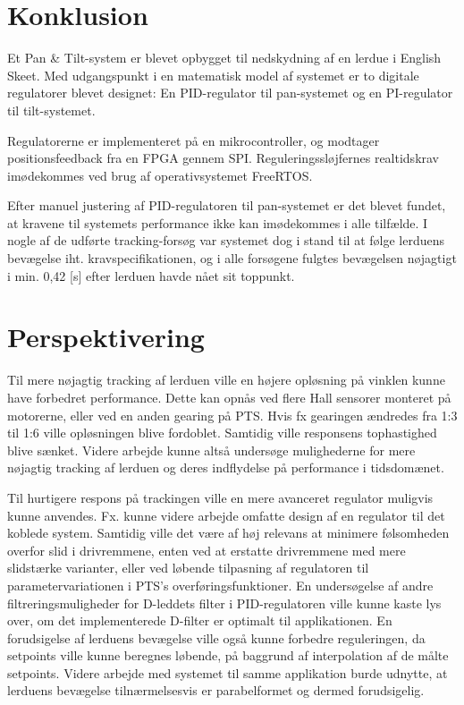 \section{Konklusion}
\label{sec:konklusion}
Et Pan \& Tilt-system er blevet opbygget til nedskydning af en lerdue i English Skeet.
Med udgangspunkt i en matematisk model af systemet er to digitale regulatorer
blevet designet: En PID-regulator til pan-systemet og en PI-regulator til tilt-systemet.

Regulatorerne er implementeret på en mikrocontroller, og modtager positionsfeedback
fra en FPGA gennem SPI.
Reguleringssløjfernes realtidskrav imødekommes ved brug af operativsystemet FreeRTOS.

Efter manuel justering af PID-regulatoren til pan-systemet er det blevet fundet,
at kravene til systemets performance ikke kan imødekommes i alle tilfælde.
I nogle af de udførte tracking-forsøg var systemet dog i stand til at følge lerduens bevægelse
iht. kravspecifikationen,
og i alle forsøgene fulgtes bevægelsen nøjagtigt i min. 0,42 [s] efter lerduen havde nået sit toppunkt.

\section{Perspektivering}
Til mere nøjagtig tracking af lerduen ville en højere opløsning på vinklen kunne have forbedret performance.
Dette kan opnås ved flere Hall sensorer monteret på motorerne, eller ved en anden gearing på PTS.
Hvis fx gearingen ændredes fra 1:3 til 1:6 ville opløsningen blive fordoblet. Samtidig ville responsens tophastighed
blive sænket. Videre arbejde kunne altså undersøge mulighederne for mere nøjagtig tracking af lerduen og deres
indflydelse på performance i tidsdomænet.

Til hurtigere respons på trackingen ville en mere avanceret regulator muligvis kunne anvendes.
Fx. kunne videre arbejde omfatte design af en regulator til det koblede system.
Samtidig ville det være af høj relevans at minimere følsomheden overfor slid i drivremmene,
enten ved at erstatte drivremmene med mere slidstærke varianter, eller ved løbende tilpasning
af regulatoren til parametervariationen i PTS's overføringsfunktioner.
En undersøgelse af andre filtreringsmuligheder for D-leddets filter i PID-regulatoren ville kunne kaste
lys over, om det implementerede D-filter er optimalt til applikationen.
En forudsigelse af lerduens bevægelse ville også kunne forbedre reguleringen,
da setpoints ville kunne beregnes løbende, på baggrund af interpolation af de målte setpoints.
Videre arbejde med systemet til samme applikation burde udnytte,
at lerduens bevægelse tilnærmelsesvis er parabelformet og dermed forudsigelig.

